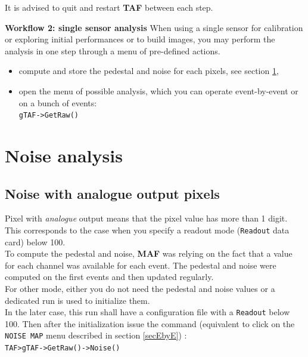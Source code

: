\documentclass[a4paper, 12pt, twoside]{article}
\newif\ifwithcomment
\newcommand{\comment}[1]{\ifwithcomment {\textcolor{blue}{\it#1}} \fi}
\newcommand{\TAF}{{\bf TAF }}
\newcommand{\MAF}{{\bf MAF }}
\begin{document}
\noindent
It is advised to quit and restart \TAF between each step.

\vspace{0.8 cm}

\noindent
{\bf Workflow 2: single sensor analysis}
\noindent
When using a single sensor for calibration or exploring initial performances or to build images, you may perform the analysis in one step through a menu of pre-defined actions.
\begin{itemize}
\item compute and store the pedestal and noise for each pixels, see section \ref{secNoise},
\item open the menu of possible analysis, which you can operate event-by-event or on a bunch of events:\\
{\tt gTAF->GetRaw()}
\end{itemize}


\vspace{2cm}

\section{Noise analysis}
\label{secNoise}

\comment{This section needs complete reshuffling since additional ways to take into account hot pixels was included by Alejandro.}

\subsection{Noise with analogue output pixels}
\label{subsec:analogueNoise}

Pixel with {\it analogue} output means that the pixel value has more than 1 digit. This corresponds to the case when you specify a readout mode ({\tt Readout} data card) below 100.\\
To compute the pedestal and noise, \MAF  was relying on the fact that a value for each channel was available for each event. The pedestal and noise were computed on the first events and then updated regularly.\\
For other mode, either you do not need the pedestal and noise values or a dedicated run is used to initialize them.\\
In the later case, this run shall have a configuration file with a {\tt Readout} below 100. Then after the initialization issue the command (equivalent to click on the {\tt NOISE MAP} menu described in section \ref{secEbyE}) :\\
\noindent
{\tt TAF>gTAF->GetRaw()->Noise()}\\
\end{document}

